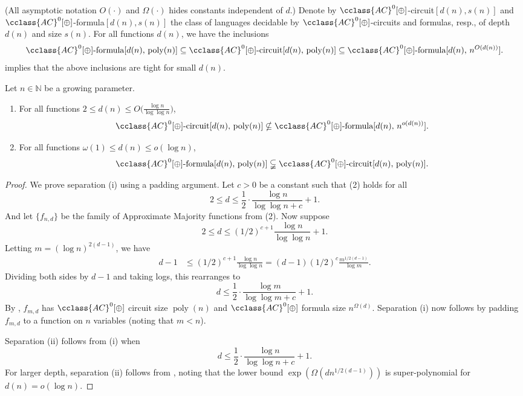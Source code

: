 \documentclass{toc}
\newcommand{\poly}{\mathop{\mathrm{poly}}}
\newcommand{\AC}{\cclass{AC}}
\begin{document}
(All asymptotic notation $O(\cdot)$ and $\Omega(\cdot)$ hides constants independent of $d$.) 
%
%
%
%
%
Denote by $\AC^0[\oplus]$-circuit$[d(n),s(n)]$
and $\AC^0[\oplus]$-formula$[d(n),s(n)]$
the class of languages decidable by $\AC^0[\oplus]$-circuits
and formulas, resp., of depth $d(n)$ and size $s(n)$.
%
For all functions $d(n)$, we have
%
the inclusions
\[
  \AC^0[\oplus]\textup{-formula}[d(n),\,\mathrm{poly}(n)]
  \subseteq
  \AC^0[\oplus]\textup{-circuit}[d(n),\,\mathrm{poly}(n)]
  \subseteq
  \AC^0[\oplus]\textup{-formula}[d(n),\,n^{O(d(n))}].  
\]
 implies that the above
%
inclusions       %
are tight for small $d(n)$.

\begin{corollary}\label{cor:separations}
Let $n \in \mathbb N$ be a growing parameter.
\begin{enumerate}[\normalfont(i)]
\item
For all functions $2 \le d(n) \le O\bigl(\frac{\log n}{\log \log n}\bigr)$, 
\[
  \AC^0[\oplus]\textup{-circuit}[d(n),\,\mathrm{poly}(n)]
  \nsubseteq
%
%
  \AC^0[\oplus]\textup{-formula}[d(n),\,n^{o(d(n))}].   %
\]
\item
For all functions $\omega(1) \le d(n) \le o(\log n)$, 
\[
  \AC^0[\oplus]\textup{-formula}[d(n),\,\mathrm{poly}(n)]
  \subsetneqq
  \AC^0[\oplus]\textup{-circuit}[d(n),\,\mathrm{poly}(n)].
\]
\end{enumerate}
\end{corollary}

\begin{proof}
  We prove separation (i) using a padding argument. Let $c > 0$ be a constant such that (2) holds for all
  \[
    2 \le d \le \frac{1}{2}\cdot \frac{\log n}{\log\log n + c} + 1.
  \]
  And let $\{f_{n,d}\}$ be the family of Approximate Majority
  functions from (2).  Now suppose
  \[
    2 \le d \le (1/2)^{c+1} \frac{\log n}{\log\log n} + 1.
  \]
  Letting $m = (\log n)^{2(d-1)}$, we have
\begin{align*}
  d - 1 &\le (1/2)^{c+1} \frac{\log n}{\log\log n}
  = (d-1) (1/2)^c \frac{m^{1/2(d-1)}}{\log m}.
\end{align*}
Dividing both sides by $d-1$ and taking logs, this rearranges to
\[
  d \le \frac{1}{2}\cdot \frac{\log m}{\log\log m + c} + 1.
\]
By , $f_{m,d}$ has $\AC^0[\oplus]$ circuit size $\poly(n)$ and $\AC^0[\oplus]$ formula size $n^{\Omega(d)}$. Separation (i) now follows by padding $f_{m,d}$ to a function on $n$ variables (noting that $m < n$).

Separation (ii) follows from (i) when
\[
  d \le \frac{1}{2}\cdot \frac{\log n}{\log\log n + c} + 1.
\]
For larger depth, separation (ii) follows from
, noting that the lower bound
$\exp(\Omega(dn^{1/2(d-1)}))$ is super-polynomial for
$d(n) = o(\log n)$.
\end{proof}
\end{document}
